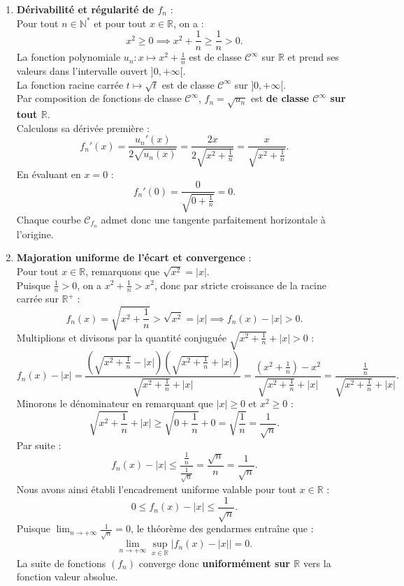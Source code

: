 \documentclass[11pt,a4paper]{article}
\newcommand{\N}{\mathbb{N}}
\newcommand{\R}{\mathbb{R}}
\begin{document}
\begin{correctionbox}
\begin{enumerate}[label=\textbf{\arabic*.}]
    \item \textbf{Dérivabilité et régularité de $f_n$} :\\
    Pour tout $n \in \N^*$ et pour tout $x \in \R$, on a :
    \[
    x^2 \ge 0 \implies x^2 + \frac{1}{n} \ge \frac{1}{n} > 0.
    \]
    La fonction polynomiale $u_n : x \mapsto x^2 + \frac{1}{n}$ est de classe $\mathcal{C}^\infty$ sur $\R$ et prend ses valeurs dans l'intervalle ouvert $]0, +\infty[$.\\
    La fonction racine carrée $t \mapsto \sqrt{t}$ est de classe $\mathcal{C}^\infty$ sur $]0, +\infty[$.\\
    Par composition de fonctions de classe $\mathcal{C}^\infty$, $f_n = \sqrt{u_n}$ est \textbf{de classe $\mathcal{C}^\infty$ sur tout $\R$}.\\
    Calculons sa dérivée première :
    \[
    f_n'(x) = \frac{u_n'(x)}{2\sqrt{u_n(x)}} = \frac{2x}{2\sqrt{x^2 + \frac{1}{n}}} = \frac{x}{\sqrt{x^2 + \frac{1}{n}}}.
    \]
    En évaluant en $x = 0$ :
    \[
    f_n'(0) = \frac{0}{\sqrt{0 + \frac{1}{n}}} = 0.
    \]
    Chaque courbe $\mathcal{C}_{f_n}$ admet donc une tangente parfaitement horizontale à l'origine.

    \item \textbf{Majoration uniforme de l'écart et convergence} :\\
    Pour tout $x \in \R$, remarquons que $\sqrt{x^2} = |x|$.\\
    Puisque $\frac{1}{n} > 0$, on a $x^2 + \frac{1}{n} > x^2$, donc par stricte croissance de la racine carrée sur $\R^+$ :
    \[
    f_n(x) = \sqrt{x^2 + \frac{1}{n}} > \sqrt{x^2} = |x| \implies f_n(x) - |x| > 0.
    \]
    Multiplions et divisons par la quantité conjuguée $\sqrt{x^2 + \frac{1}{n}} + |x| > 0$ :
    \[
    f_n(x) - |x| = \frac{\left(\sqrt{x^2 + \frac{1}{n}} - |x|\right)\left(\sqrt{x^2 + \frac{1}{n}} + |x|\right)}{\sqrt{x^2 + \frac{1}{n}} + |x|} = \frac{\left(x^2 + \frac{1}{n}\right) - x^2}{\sqrt{x^2 + \frac{1}{n}} + |x|} = \frac{\frac{1}{n}}{\sqrt{x^2 + \frac{1}{n}} + |x|}.
    \]
    Minorons le dénominateur en remarquant que $|x| \ge 0$ et $x^2 \ge 0$ :
    \[
    \sqrt{x^2 + \frac{1}{n}} + |x| \ge \sqrt{0 + \frac{1}{n}} + 0 = \sqrt{\frac{1}{n}} = \frac{1}{\sqrt{n}}.
    \]
    Par suite :
    \[
    f_n(x) - |x| \le \frac{\frac{1}{n}}{\frac{1}{\sqrt{n}}} = \frac{\sqrt{n}}{n} = \frac{1}{\sqrt{n}}.
    \]
    Nous avons ainsi établi l'encadrement uniforme valable pour tout $x \in \R$ :
    \[
    0 \le f_n(x) - |x| \le \frac{1}{\sqrt{n}}.
    \]
    Puisque $\lim_{n \to +\infty} \frac{1}{\sqrt{n}} = 0$, le théorème des gendarmes entraîne que :
    \[
    \lim_{n \to +\infty} \sup_{x \in \R} |f_n(x) - |x|| = 0.
    \]
    La suite de fonctions $(f_n)$ converge donc \textbf{uniformément sur $\R$} vers la fonction valeur absolue.


\end{enumerate}
\end{correctionbox}
\end{document}
